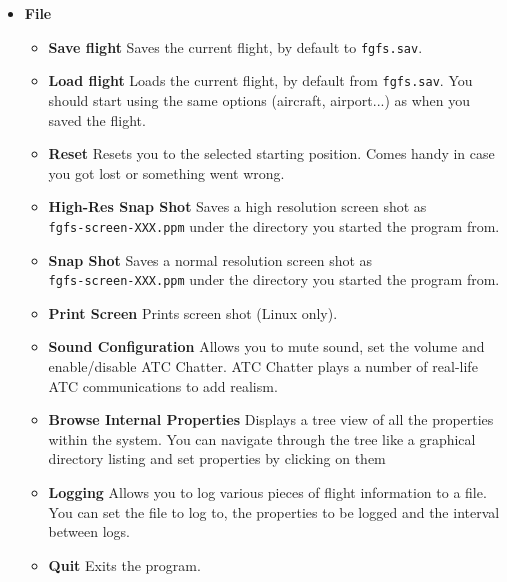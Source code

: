 \begin{itemize}
 \item \textbf{File}
 \begin{itemize}
  \item \textbf{Save flight} Saves the current flight, by
default to \texttt{fgfs.sav}.
 \item \textbf{Load flight} Loads the current flight, by
default from \texttt{fgfs.sav}. You should
start \FlightGear{} using the same options (aircraft, airport...) as when you
saved the flight.
 \item \textbf{Reset} Resets you to the selected starting
position. 
 Comes handy in case you got lost or something went wrong.
  \item \textbf{High-Res Snap Shot} Saves a high resolution screen
shot as \\ \texttt{fgfs-screen-XXX.ppm} under 
  the directory you started the program from.
  \item \textbf{Snap Shot} Saves a normal resolution screen
shot as \\ \texttt{fgfs-screen-XXX.ppm} under 
  the directory you started the program from.
  \item \textbf{Print Screen} Prints screen shot (Linux only).
  \item \textbf{Sound Configuration} Allows you to mute sound, set the volume
and enable/disable ATC Chatter. 
  ATC Chatter plays a number of real-life ATC communications to add realism.
  \item \textbf{Browse Internal Properties} Displays a tree view of all the
properties within the system. 
  You can navigate through the tree like a graphical directory listing and set
properties by clicking on them
  \item \textbf{Logging} Allows you to log various pieces of flight information
to a file. 
  You can set the file to log to, the properties to be logged and the interval
between logs. 
  \item \textbf{Quit} Exits the program.
 \end{itemize}


\end{itemize}
